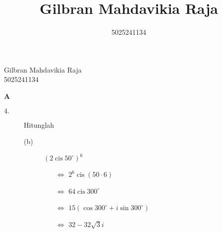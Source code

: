 \documentclass{article}
\title{Gilbran Mahdavikia Raja}
\author{5025241134}
\DeclareMathOperator\cis{cis}
\begin{document}
\begin{flushleft}
    Gilbran Mahdavikia Raja \\
    5025241134 \\
\end{flushleft}
{\Large \textbf{A}}
\begin{description}
    \item[$4.$] Hitunglah    
    \begin{description}
        \item[(b)] $(2 \cis 50^{\circ})^6$
        \begin{itemize}
            \item[$\Leftrightarrow$] $2^6 \cis (50 \cdot 6)$
            \item[$\Leftrightarrow$] $64\cis300^{\circ}$
            \item[$\Leftrightarrow$] $15(\cos 300^{\circ} + i \sin 300^{\circ})$
            \item[$\Leftrightarrow$] $32-32\sqrt{3}i$
        \end{itemize}
    \end{description}
\end{description}
\end{document}
